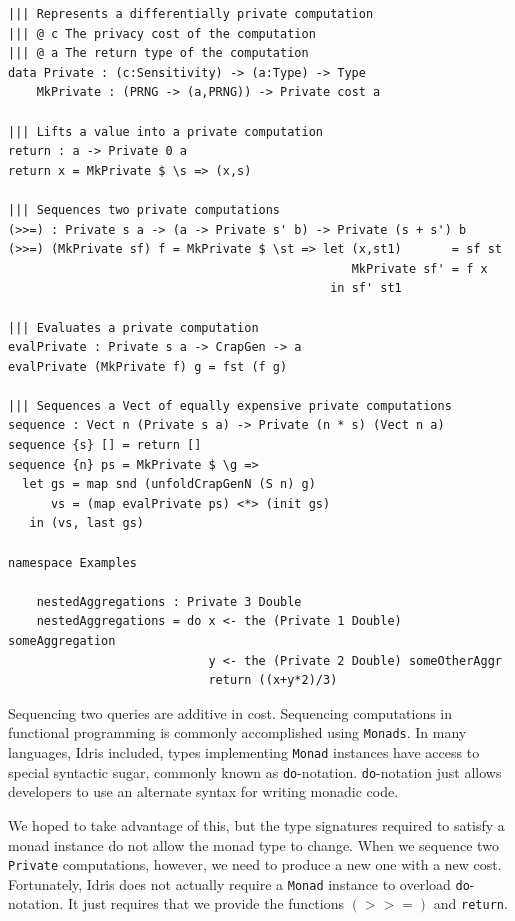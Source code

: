 \documentclass[12pt]{report}
\begin{document}
\begin{lstlisting}[float,caption={Representing differentially private mechanisms},label={lst:mechanisms}]
||| Represents a differentially private computation
||| @ c The privacy cost of the computation
||| @ a The return type of the computation
data Private : (c:Sensitivity) -> (a:Type) -> Type
    MkPrivate : (PRNG -> (a,PRNG)) -> Private cost a

||| Lifts a value into a private computation
return : a -> Private 0 a
return x = MkPrivate $ \s => (x,s)

||| Sequences two private computations
(>>=) : Private s a -> (a -> Private s' b) -> Private (s + s') b
(>>=) (MkPrivate sf) f = MkPrivate $ \st => let (x,st1)       = sf st
                                                MkPrivate sf' = f x
                                             in sf' st1

||| Evaluates a private computation
evalPrivate : Private s a -> CrapGen -> a
evalPrivate (MkPrivate f) g = fst (f g)

||| Sequences a Vect of equally expensive private computations
sequence : Vect n (Private s a) -> Private (n * s) (Vect n a)
sequence {s} [] = return []
sequence {n} ps = MkPrivate $ \g =>
  let gs = map snd (unfoldCrapGenN (S n) g)
      vs = (map evalPrivate ps) <*> (init gs)
   in (vs, last gs)

namespace Examples

    nestedAggregations : Private 3 Double
    nestedAggregations = do x <- the (Private 1 Double) someAggregation
                            y <- the (Private 2 Double) someOtherAggr
                            return ((x+y*2)/3)
\end{lstlisting}

Sequencing two queries are additive in cost.
Sequencing computations in functional programming is commonly accomplished using \texttt{Monads}.
In many languages, Idris included, types implementing \texttt{Monad} instances have access to special syntactic sugar, commonly known as \texttt{do}-notation.
\texttt{do}-notation just allows developers to use an alternate syntax for writing monadic code.

We hoped to take advantage of this, but the type signatures required to satisfy a monad instance do not allow the monad type to change.
When we sequence two \texttt{Private} computations, however, we need to produce a new one with a new cost.
Fortunately, Idris does not actually require a \texttt{Monad} instance to overload \texttt{do}-notation.
It just requires that we provide the functions \texttt{$(>>=)$} and \texttt{return}.
\end{document}
